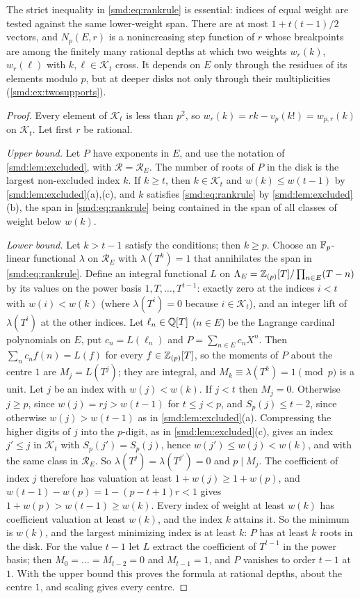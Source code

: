 The strict inequality in \eqref{smd:eq:rankrule} is essential: indices of equal weight are
tested against the same lower-weight span. There are at most $1+t(t-1)/2$ vectors, and
$N_p(E,r)$ is a nonincreasing step function of $r$ whose breakpoints are among the finitely
many rational depths at which two weights $w_r(k)$, $w_r(\ell)$ with $k,\ell\in\mathcal K_t$
cross. It depends on $E$ only through the residues of its elements modulo $p$, but at
deeper disks not only through their multiplicities (\cref{smd:ex:twosupports}).

\begin{proof}
Every element of $\mathcal K_t$ is less than $p^2$, so $w_r(k)=rk-v_p(k!)=w_{p,r}(k)$ on
$\mathcal K_t$. Let first $r$ be rational.

\emph{Upper bound.} Let $P$ have exponents in $E$, and use the notation of
\cref{smd:lem:excluded}, with $\mathcal R=\mathcal R_E$. The number of roots of $P$ in
the disk is the largest non-excluded index $k$. If $k\ge t$, then $k\in\mathcal K_t$ and
$w(k)\le w(t-1)$ by \cref{smd:lem:excluded}(a),(c), and $k$ satisfies
\eqref{smd:eq:rankrule} by \cref{smd:lem:excluded}(b), the span in
\eqref{smd:eq:rankrule} being contained in the span of all classes of weight below $w(k)$.

\emph{Lower bound.} Let $k>t-1$ satisfy the conditions; then $k\ge p$. Choose an
$\mathbb{F}_p$-linear functional $\lambda$ on $\mathcal R_E$ with $\lambda(T^k)=1$ that annihilates
the span in \eqref{smd:eq:rankrule}. Define an integral functional $L$ on
$\Lambda_E=\mathbb{Z}_{(p)}[T]/\prod_{n\in E}(T-n)$ by its values on the power basis
$1,T,\dots,T^{t-1}$: exactly zero at the indices $i<t$ with $w(i)<w(k)$ (where
$\lambda(T^i)=0$ because $i\in\mathcal K_t$), and an integer lift of $\lambda(T^i)$ at the
other indices. Let $\ell_n\in\mathbb{Q}[T]$ ($n\in E$) be the Lagrange cardinal polynomials on $E$,
put $c_n=L(\ell_n)$ and $P=\sum_{n\in E}c_nX^n$. Then $\sum_nc_nf(n)=L(f)$ for every
$f\in\mathbb{Z}_{(p)}[T]$, so the moments of $P$ about the centre $1$ are $M_j=L(T^j)$; they are
integral, and $M_k\equiv\lambda(T^k)=1\pmod p$ is a unit. Let $j$ be an index with
$w(j)<w(k)$. If $j<t$ then $M_j=0$. Otherwise $j\ge p$, since $w(j)=rj>w(t-1)$ for
$t\le j<p$, and $S_p(j)\le t-2$, since otherwise $w(j)>w(t-1)$ as in
\cref{smd:lem:excluded}(a). Compressing the higher digits of $j$ into the $p$-digit, as in
\cref{smd:lem:excluded}(c), gives an index $j'\le j$ in $\mathcal K_t$ with
$S_p(j')=S_p(j)$, hence $w(j')\le w(j)<w(k)$, and with the same class in $\mathcal R_E$.
So $\lambda(T^j)=\lambda(T^{j'})=0$ and $p\mid M_j$. The coefficient of index $j$ therefore
has valuation at least $1+w(j)\ge1+w(p)$, and $w(t-1)-w(p)=1-(p-t+1)r<1$ gives
$1+w(p)>w(t-1)\ge w(k)$. Every index of weight at least $w(k)$ has coefficient valuation at
least $w(k)$, and the index $k$ attains it. So the minimum is $w(k)$, and the largest
minimizing index is at least $k$: $P$ has at least $k$ roots in the disk. For the value
$t-1$ let $L$ extract the coefficient of $T^{t-1}$ in the power basis; then
$M_0=\dots=M_{t-2}=0$ and $M_{t-1}=1$, and $P$ vanishes to order $t-1$ at $1$. With the
upper bound this proves the formula at rational depths, about the centre $1$, and scaling
gives every centre.


\end{proof}
